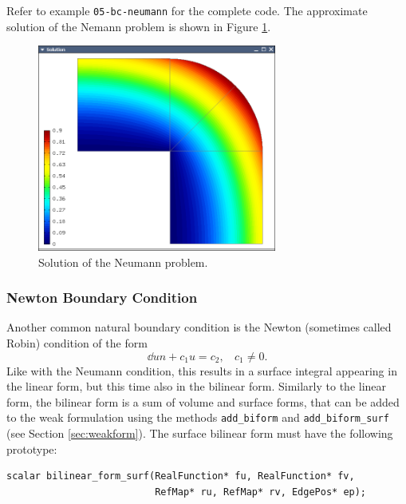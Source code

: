 Refer to example {\tt 05-bc-neumann} for the complete code. The approximate solution 
of the Nemann problem is shown in Figure \ref{fig:neumann}. 

\begin{figure}[ht]
  \centering\medskip
  \includegraphics[width=0.7\textwidth]{img/neumann.png}
  \caption{Solution of the Neumann problem.}
  \label{fig:neumann}
\end{figure}


\subsubsection{Newton Boundary Condition}

Another common natural boundary condition is the Newton (sometimes called Robin) condition
of the form
$$\dd{u}{n} + c_1 u = c_2, \ \ \ \ c_1 \ne 0.$$
Like with the Neumann condition, this results in a surface integral appearing in the linear form,
but this time also in the bilinear form. Similarly to the linear form, the bilinear form is
a sum of volume and surface forms, that can be added to the weak formulation using the methods
{\tt add\_biform} and {\tt add\_biform\_surf} (see Section \ref{sec:weakform}).
The surface bilinear form must have the following prototype:

\begin{lstlisting}
scalar bilinear_form_surf(RealFunction* fu, RealFunction* fv,
                          RefMap* ru, RefMap* rv, EdgePos* ep);
\end{lstlisting}

